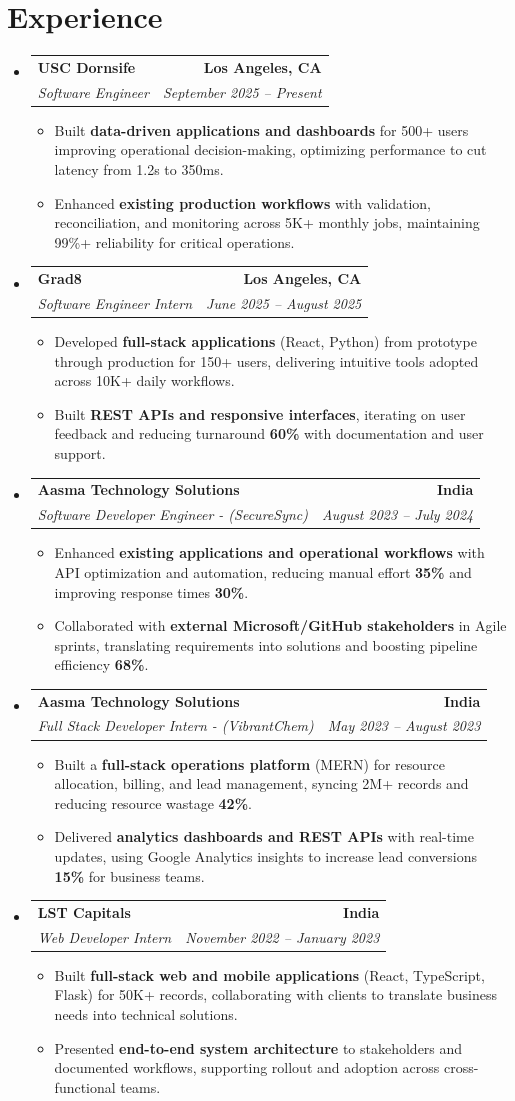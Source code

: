 \documentclass[letterpaper,10pt]{article}
\makeatletter
\newcommand{\resumeItem}[1]{\item\small{{#1 \vspace{-2pt}}}}
\newcommand{\resumeSubheading}[4]{\vspace{-1pt}\item\begin{tabular*}{1.0\textwidth}[t]{l@{\extracolsep{\fill}}r}\textbf{#1} & \textbf{\small #2} \\\textit{\small#3} & \textit{\small #4} \\\end{tabular*}\vspace{-2pt}}
\newcommand{\resumeSubHeadingListStart}{\begin{itemize}[leftmargin=0.0in, label={}]}
\newcommand{\resumeSubHeadingListEnd}{\end{itemize}}
\newcommand{\resumeItemListStart}{\begin{itemize}[leftmargin=0.15in,label=\textbullet,itemsep=2pt,topsep=0pt,parsep=0pt,partopsep=0pt]}
\newcommand{\resumeItemListEnd}{\end{itemize}\vspace{-4pt}}
\makeatother
\begin{document}
\section{Experience}
\resumeSubHeadingListStart
\resumeSubheading{USC Dornsife}{Los Angeles, CA}{Software Engineer}{September 2025 -- Present}
\resumeItemListStart
\resumeItem{Built \textbf{data-driven applications and dashboards} for 500+ users improving operational decision-making, optimizing performance to cut latency from 1.2s to 350ms.}
\resumeItem{Enhanced \textbf{existing production workflows} with validation, reconciliation, and monitoring across 5K+ monthly jobs, maintaining 99\%+ reliability for critical operations.}
\resumeItemListEnd
\resumeSubheading{Grad8}{Los Angeles, CA}{Software Engineer Intern}{June 2025 -- August 2025}
\resumeItemListStart
\resumeItem{Developed \textbf{full-stack applications} (React, Python) from prototype through production for 150+ users, delivering intuitive tools adopted across 10K+ daily workflows.}
\resumeItem{Built \textbf{REST APIs and responsive interfaces}, iterating on user feedback and reducing turnaround \textbf{60\%} with documentation and user support.}
\resumeItemListEnd
\resumeSubheading{Aasma Technology Solutions}{India}{Software Developer Engineer - (SecureSync)}{August 2023 -- July 2024}
\resumeItemListStart
\resumeItem{Enhanced \textbf{existing applications and operational workflows} with API optimization and automation, reducing manual effort \textbf{35\%} and improving response times \textbf{30\%}.}
\resumeItem{Collaborated with \textbf{external Microsoft/GitHub stakeholders} in Agile sprints, translating requirements into solutions and boosting pipeline efficiency \textbf{68\%}.}
\resumeItemListEnd
\resumeSubheading{Aasma Technology Solutions}{India}{Full Stack Developer Intern - (VibrantChem)}{May 2023 -- August 2023}
\resumeItemListStart
\resumeItem{Built a \textbf{full-stack operations platform} (MERN) for resource allocation, billing, and lead management, syncing 2M+ records and reducing resource wastage \textbf{42\%}.}
\resumeItem{Delivered \textbf{analytics dashboards and REST APIs} with real-time updates, using Google Analytics insights to increase lead conversions \textbf{15\%} for business teams.}
\resumeItemListEnd
\resumeSubheading{LST Capitals}{India}{Web Developer Intern}{November 2022 -- January 2023}
\resumeItemListStart
\resumeItem{Built \textbf{full-stack web and mobile applications} (React, TypeScript, Flask) for 50K+ records, collaborating with clients to translate business needs into technical solutions.}
\resumeItem{Presented \textbf{end-to-end system architecture} to stakeholders and documented workflows, supporting rollout and adoption across cross-functional teams.}
\resumeItemListEnd
\resumeSubHeadingListEnd
\vspace{-6pt}
\end{document}
